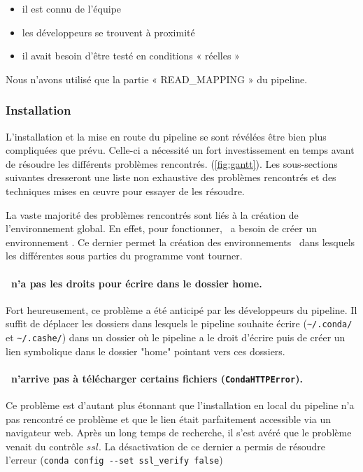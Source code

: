 \documentclass[../main]{subfiles} %
\begin{document}
\begin{itemize}
    \item il est connu de l’équipe
    \item les développeurs se trouvent à proximité
    \item il avait besoin d’être testé en conditions « réelles »
\end{itemize}

Nous n’avons utilisé que la partie « READ\_MAPPING » du pipeline.



\subsubsection{Installation}
L’installation et la mise en route du pipeline se sont révélées être bien plus compliquées que prévu. Celle-ci a nécessité un fort investissement en temps avant de résoudre les différents problèmes rencontrés. (\cref{fig:gantt}). Les sous-sections suivantes dresseront une liste non exhaustive des problèmes rencontrés et des techniques mises en œuvre pour essayer de les résoudre.

La vaste majorité des problèmes rencontrés sont liés à la création de l’environnement global. En effet, pour fonctionner, \GeCKO a besoin de créer un environnement \Conda. Ce dernier permet la création des environnements \SnakeMake dans lesquels les différentes sous parties du programme vont tourner. 

\paragraph{\Slurm n’a pas les droits pour écrire dans le dossier home.} Fort heureusement, ce problème a été anticipé par les développeurs du pipeline. Il suffit de déplacer les dossiers dans lesquels le pipeline souhaite écrire (\lstinline{~/.conda/} et \lstinline{~/.cashe/}) dans un dossier où le pipeline a le droit d’écrire puis de créer un lien symbolique dans le dossier "home" pointant vers ces dossiers.

\paragraph{\Conda n’arrive pas à télécharger certains fichiers (\lstinline{CondaHTTPError}).} Ce problème est d’autant plus étonnant que l’installation en local du pipeline n’a pas rencontré ce problème et que le lien était parfaitement accessible via un navigateur web. Après un long temps de recherche, il s’est avéré que le problème venait du contrôle $ssl$. La désactivation de ce dernier a permis de résoudre l’erreur (\lstinline{conda config --set ssl_verify false})
\end{document}
